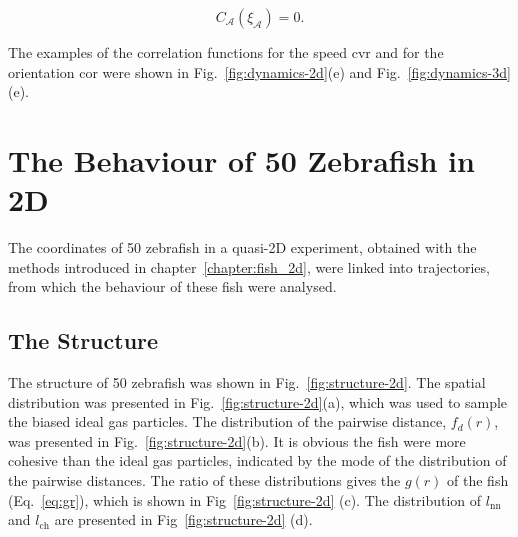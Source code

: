 \documentclass[11pt,twoside]{report}
\begin{document}
\begin{equation}
	C_{\mathcal{A}}(\xi_\mathcal{A}) = 0.
\label{eq:length-dynamics}
\end{equation}


\noindent The examples of the correlation functions for the speed \gls{cvr} and for the orientation \gls{cor} were shown in Fig.~\ref{fig:dynamics-2d}(e) and Fig.~\ref{fig:dynamics-3d}(e).





\section{The Behaviour of 50 Zebrafish in 2D}

The coordinates of 50 zebrafish in a quasi-2D experiment, obtained with the methods introduced in chapter~\ref{chapter:fish_2d}, were linked into trajectories, from which the behaviour of these fish were analysed.

\subsection{The Structure}
\label{section:analysis-structure-2d}


The structure of 50 zebrafish was shown in Fig.~\ref{fig:structure-2d}. The spatial distribution was presented in Fig.~\ref{fig:structure-2d}(a), which was used to sample the biased ideal gas particles. The distribution of the pairwise distance, $f_d(r)$, was presented in Fig.~\ref{fig:structure-2d}(b). It is obvious the fish were more cohesive than the ideal gas particles, indicated by the mode of the distribution of the pairwise distances. The ratio of these distributions gives the $g(r)$ of the fish (Eq.~\ref{eq:gr}), which is shown in Fig~\ref{fig:structure-2d} (c). The distribution of $l_\mathrm{nn}$ and $l_\mathrm{ch}$ are presented in Fig~\ref{fig:structure-2d} (d).
\end{document}
